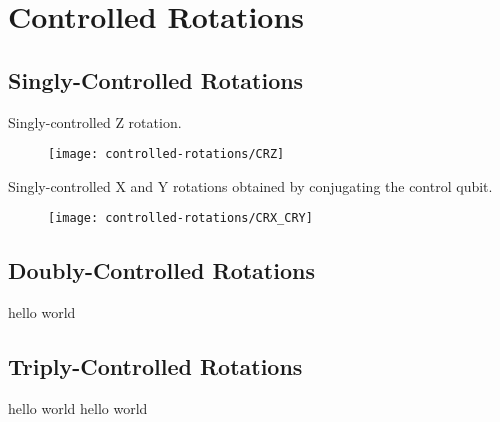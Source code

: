 \chapter{\label{controlled-rotations}Controlled Rotations}

\section{Singly-Controlled Rotations}
Singly-controlled Z rotation.

\begin{figure}[hb]
    \centering
    \texttt{[image: controlled-rotations/CRZ]}
\end{figure}

Singly-controlled X and Y rotations obtained by conjugating the control qubit.

\begin{figure}[hb]
    \centering
    \texttt{[image: controlled-rotations/CRX\_CRY]}
\end{figure}


\section{Doubly-Controlled Rotations}
hello world


\section{Triply-Controlled Rotations}
hello world
hello world
